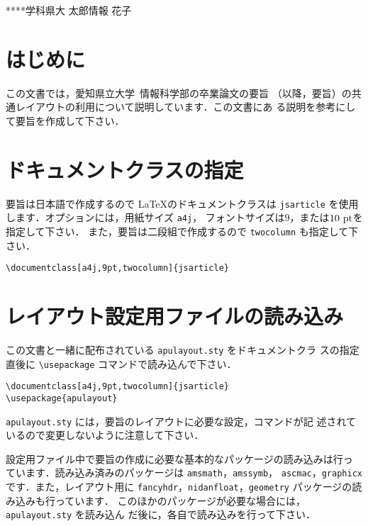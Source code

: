 \documentclass[a4j,9pt,twocolumn]{jsarticle}
\begin{document}
{****学科}{県大 太郎}{情報 花子}

\section{はじめに}
この文書では，愛知県立大学~情報科学部の卒業論文の要旨
（以降，要旨）の共通レイアウトの利用について説明しています．この文書にあ
る説明を参考にして要旨を作成して下さい．

\section{ドキュメントクラスの指定}
要旨は日本語で作成するので \LaTeX のドキュメントクラスは
\texttt{jsarticle} を使用します．オプションには，用紙サイズ \texttt{a4j}，
フォントサイズは$9$，または$10\ {\rm pt}$を指定して下さい．
また，要旨は二段組で作成するので \texttt{twocolumn} も指定して下さい．
\begin{screen}
 \begin{small}
  \verb#\documentclass[a4j,9pt,twocolumn]{jsarticle}#
 \end{small}
\end{screen}

\section{レイアウト設定用ファイルの読み込み}
この文書と一緒に配布されている \texttt{apulayout.sty} をドキュメントクラ
スの指定直後に \verb#\usepackage# コマンドで読み込んで下さい．
\begin{screen}
 \begin{small}
  \verb#\documentclass[a4j,9pt,twocolumn]{jsarticle}#\\[-0.5em]
  \verb#\usepackage{apulayout}#
 \end{small}
\end{screen}

\texttt{apulayout.sty} には，要旨のレイアウトに必要な設定，コマンドが記
述されているので変更しないように注意して下さい．

設定用ファイル中で要旨の作成に必要な基本的なパッケージの読み込みは行っ
ています．読み込み済みのパッケージは \texttt{amsmath}，\texttt{amssymb}，
\texttt{ascmac}，\texttt{graphicx} です．また，レイアウト用に
\texttt{fancyhdr}，\texttt{nidanfloat}，\texttt{geometry} パッケージの読
み込みも行っています．
このほかのパッケージが必要な場合には，\texttt{apulayout.sty} を読み込ん
だ後に，各自で読み込みを行って下さい．
\end{document}
